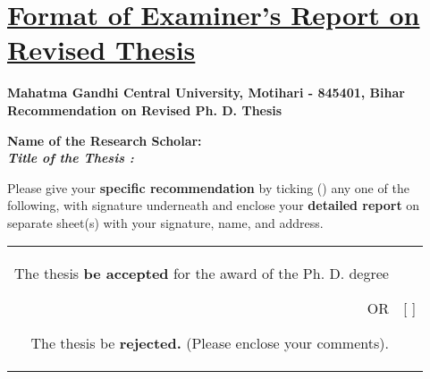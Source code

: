 \chapter*{\uline{Format of Examiner's Report on Revised Thesis}}

\begin{center} 
\textbf{\normalsize Mahatma Gandhi Central University, Motihari - 845401, Bihar} \\ 
\textbf{\normalsize Recommendation on Revised Ph. D. Thesis} 
\end{center} 
\vspace{-.75cm} 
\begin{flushleft} 
\textbf{Name of the Research Scholar:} \\
\textbf{\textit{Title of the Thesis :}}
\end{flushleft} 

Please give your \textbf{specific recommendation} by ticking (\checkmark) any one of the following, with signature underneath and enclose your \textbf{detailed report} on separate sheet(s) with your signature, name, and address.\vspace{-.25cm}

\begin{table}[h]
\begin{center}
\begin{tabular}{r  l}
   \begin{minipage}{0.85\textwidth}
\begin{flushleft}
The thesis \textbf{be accepted} for the award of the Ph. D. degree
\begin{center}
OR
\end{center}
The thesis be \textbf{rejected.} (Please enclose your comments).
\end{flushleft}
\end{minipage}
&
\begin{minipage}{0.05\textwidth}
\begin{flushright}
[\hspace{2mm} ]
\begin{center}
\bigskip
\end{center}
[\hspace{2mm} ]
\end{flushright}
\end{minipage}
\noindent
\\
\end{tabular}
\end{center}
\end{table}

